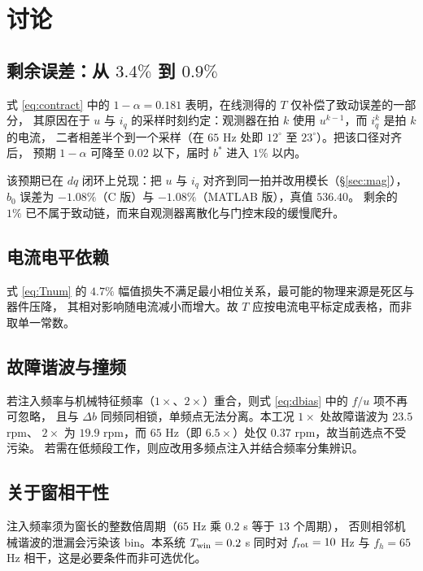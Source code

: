 \documentclass[11pt,a4paper]{ctexart}
\begin{document}
\section{讨论}

\subsection{剩余误差：从 $3.4\%$ 到 $0.9\%$}
\label{sec:remain}

式 \eqref{eq:contract} 中的 $1-\alpha=0.181$ 表明，在线测得的 $T$ 仅补偿了致动误差的一部分，
其原因在于 $u$ 与 $i_q$ 的采样时刻约定：观测器在拍 $k$ 使用 $u^{k-1}$，而 $i_q^k$ 是拍 $k$ 的电流，
二者相差半个到一个采样（在 $65$ Hz 处即 $12^{\circ}$ 至 $23^{\circ}$）。把该口径对齐后，
预期 $1-\alpha$ 可降至 $0.02$ 以下，届时 $b^*$ 进入 $1\%$ 以内。

该预期已在 $dq$ 闭环上兑现：把 $u$ 与 $i_q$ 对齐到同一拍并改用模长（\S\ref{sec:mag}），
$\hat b_0$ 误差为 $-1.08\%$（C 版）与 $-1.08\%$（MATLAB 版），真值 $536.40$。
剩余的 $1\%$ 已不属于致动链，而来自观测器离散化与门控末段的缓慢爬升。

\subsection{电流电平依赖}

式 \eqref{eq:Tnum} 的 $4.7\%$ 幅值损失不满足最小相位关系，最可能的物理来源是死区与器件压降，
其相对影响随电流减小而增大。故 $T$ 应按电流电平标定成表格，而非取单一常数。

\subsection{故障谐波与撞频}

若注入频率与机械特征频率（$1\times$、$2\times$）重合，则式 \eqref{eq:dbias} 中的 $f/u$ 项不再可忽略，
且与 $\Delta b$ 同频同相锁，单频点无法分离。本工况 $1\times$ 处故障谐波为 $23.5$ rpm、
$2\times$ 为 $19.9$ rpm，而 $65$ Hz（即 $6.5\times$）处仅 $0.37$ rpm，故当前选点不受污染。
若需在低频段工作，则应改用多频点注入并结合频率分集辨识。

\subsection{关于窗相干性}

注入频率须为窗长的整数倍周期（$65$ Hz 乘 $0.2$ s 等于 $13$ 个周期），
否则相邻机械谐波的泄漏会污染该 bin。本系统 $T_{\rm win}=0.2$ s 同时对
$f_{\rm rot}=10$ Hz 与 $f_h=65$ Hz 相干，这是必要条件而非可选优化。
\end{document}
